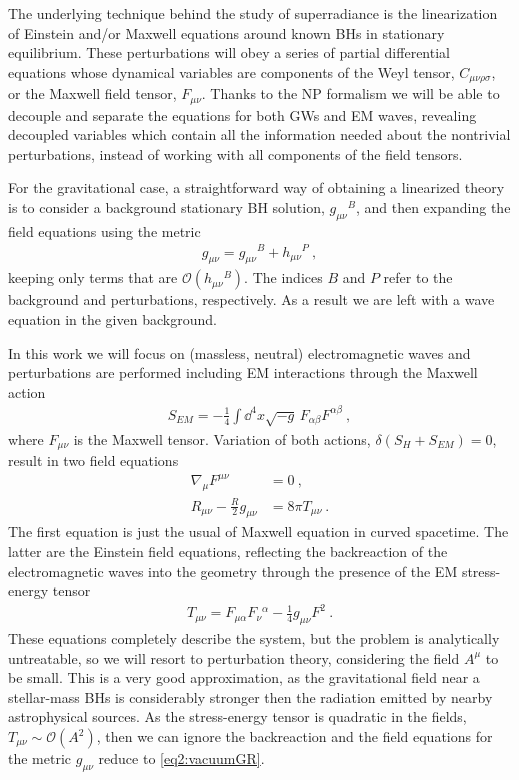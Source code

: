 The underlying technique behind the study of superradiance is the linearization of Einstein and/or Maxwell equations around known BHs in stationary equilibrium.
These perturbations will obey a series of partial differential equations whose dynamical variables are components of the Weyl tensor, $C_{\mu\nu\rho\sigma}$, or the Maxwell field tensor, $F_{\mu\nu}$.
Thanks to the NP formalism we will be able to decouple and separate the equations for both GWs and EM waves, revealing decoupled variables which contain all the information needed about the nontrivial perturbations, instead of working with all components of the field tensors.

For the gravitational case, a straightforward way of obtaining a linearized theory is to consider a background stationary BH solution, $g_{\mu\nu}{}^B$, and then expanding the field equations  using the metric 
\begin{align}
    g_{\mu\nu} = g_{\mu\nu}{}^B + h_{\mu\nu}{}^P ~,
    \label{eq2:metricBP}
\end{align}
keeping only terms that are $\mathscr{O}(h_{\mu\nu}{}^B)$. The indices $B$ and $P$ refer to the background and perturbations, respectively.
As a result we are left with a wave equation in the given background. 

In this work we will focus on (massless, neutral) electromagnetic waves and perturbations are performed including EM interactions through the Maxwell action
\begin{align}
    S_{EM} = - \frac{1}{4} \int \dd^4 x \sqrt{-g} \,F_{\alpha\beta} F^{\alpha\beta} ~,
     \label{eq2:actionEM}
\end{align}
where $F_{\mu\nu}$ is the Maxwell tensor.
Variation of both actions, $\delta(S_H + S_{EM}) = 0$, result in two field equations
\begin{align}
    \nabla_\mu F^{\mu\nu} &= 0 ~, \label{eq2:maxwellEM} \\
    R_{\mu\nu} - \frac{R}{2} g_{\mu\nu} &= 8 \pi T_{\mu\nu} \label{eq2:EM+GR}  ~.
\end{align}
The first equation is just the usual of Maxwell equation in curved spacetime.
The latter are the Einstein field equations, reflecting the backreaction of the electromagnetic waves into the geometry through the presence of the EM stress-energy tensor
\begin{align}
    T_{\mu\nu} = F_{\mu\alpha} F_{\nu}{}^{\alpha} - \frac{1}{4} g_{\mu\nu} F^2  ~.
    \label{eq2:stressenergyEM}
\end{align}
These equations completely describe the system, but the problem is analytically untreatable, so we will resort to perturbation theory, considering the field $A^\mu$ to be small. 
This is a very good approximation, as the gravitational field near a stellar-mass BHs is considerably stronger then the radiation emitted by nearby astrophysical sources.
As the stress-energy tensor is quadratic in the fields, $T_{\mu\nu}\sim\mathscr{O}(A^2)$, then we can ignore the backreaction and the field equations for the metric $g_{\mu\nu}$ reduce to \eqref{eq2:vacuumGR}.

